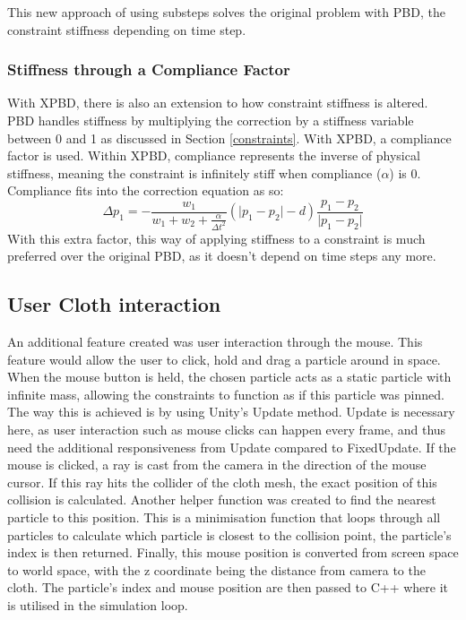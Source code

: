 \documentclass[12pt,a4paper]{article}
\begin{document}
This new approach of using substeps solves the original problem with PBD, the constraint stiffness depending on time step. 
\subsubsection{Stiffness through a Compliance Factor}
With XPBD, there is also an extension to how constraint stiffness is altered. PBD handles stiffness by multiplying the correction by a stiffness variable between 0 and 1 as discussed in Section \ref{constraints}. With XPBD, a compliance factor is used. Within XPBD, compliance represents the inverse of physical stiffness, meaning the constraint is infinitely stiff when compliance ($\alpha$) is 0. Compliance fits into the correction equation as so:
\[{\Delta}p_1=-\frac{w_1}{w_1+w_2+\frac{\alpha}{{\Delta}t^2}}(\lvert p_1-p_2 \rvert -d)\frac{p_1-p_2}{\lvert p_1-p_2 \rvert}\] 
With this extra factor, this way of applying stiffness to a constraint is much preferred over the original PBD, as it doesn't depend on time steps any more.
\subsection{User Cloth interaction}
An additional feature created was user interaction through the mouse. This feature would allow the user to click, hold and drag a particle around in space. When the mouse button is held, the chosen particle acts as a static particle with infinite mass, allowing the constraints to function as if this particle was pinned. \\

The way this is achieved is by using Unity's Update method. Update is necessary here, as user interaction such as mouse clicks can happen every frame, and thus need the additional responsiveness from Update compared to FixedUpdate. If the mouse is clicked, a ray is cast from the camera in the direction of the mouse cursor. If this ray hits the collider of the cloth mesh, the exact position of this collision is calculated. Another helper function was created to find the nearest particle to this position. This is a minimisation function that loops through all particles to calculate which particle is closest to the collision point, the particle's index is then returned. Finally, this mouse position is converted from screen space to world space, with the z coordinate being the distance from camera to the cloth. The particle's index and mouse position are then passed to C++ where it is utilised in the simulation loop. \\
\end{document}
